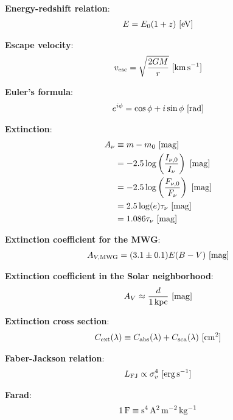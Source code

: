 \documentclass[a4paper,10pt]{article}
\begin{document}
{\noindent}\textbf{Energy-redshift relation}:
\begin{align*}
    E = E_0(1+z) ~ [{\rm eV}]
\end{align*}

{\noindent}\textbf{Escape velocity}:
\begin{align*}
    v_\mathrm{esc} = \sqrt{\frac{2GM}{r}} ~ [{\rm km\,s^{-1}}]
\end{align*}

{\noindent}\textbf{Euler's formula}:
\begin{align*}
    e^{i\phi} = \cos\phi + i\sin\phi ~ [{\rm rad}]
\end{align*}

{\noindent}\textbf{Extinction}:
\begin{align*}
    A_\nu &\equiv m-m_0 ~ [{\rm mag}] \\
          & = -2.5\log\left(\frac{I_{\nu,0}}{I_\nu}\right) ~ [{\rm mag}] \\
          & = -2.5\log\left(\frac{F_{\nu,0}}{F_\nu}\right) ~ [{\rm mag}] \\
          &= 2.5\log(e)\tau_\nu ~ [{\rm mag}] \\
          &= 1.086\tau_\nu ~ [{\rm mag}]
\end{align*}

{\noindent}\textbf{Extinction coefficient for the MWG}:
\begin{align*}
    A_{V,\mathrm{MWG}} = (3.1\pm0.1)E(B-V) ~ [{\rm mag}]
\end{align*}

{\noindent}\textbf{Extinction coefficient in the Solar neighborhood}:
\begin{align*}
    A_V \approx \frac{d}{1\,{\rm kpc}} ~ [{\rm mag}]
\end{align*}

{\noindent}\textbf{Extinction cross section}:
\begin{align*}
    C_{\rm ext}(\lambda) \equiv C_{\rm abs}(\lambda)+C_{\rm sca}(\lambda) ~ [{\rm cm^2}]
\end{align*}

{\noindent}\textbf{Faber-Jackson relation}:
\begin{align*}
    L_\mathrm{FJ} \propto \sigma_v^4 ~ [{\rm erg\,s^{-1}}]
\end{align*}

{\noindent}\textbf{Farad}:
\begin{align*}
    {\rm 1\,F \equiv s^4\,A^2\,m^{-2}\,kg^{-1}}
\end{align*}
\end{document}
